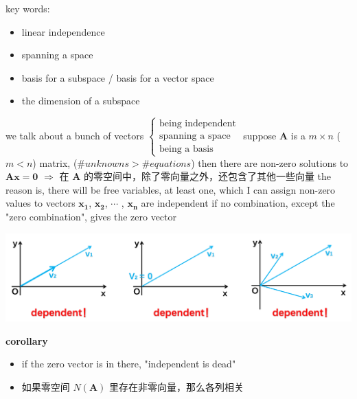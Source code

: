 \documentclass[12pt, a4paper]{article}
\begin{document}
{\noindent key words:
\begin{itemize}
	\item linear independence
	\item spanning a space
	\item basis for a subspace / basis for a vector space
	\item the dimension of a subspace
\end{itemize}
we talk about a bunch of vectors 
\begin{math}
	\left\{
		\begin{array}{l}
			{\text{being independent}} \\
			{\text{spanning a space}} \\
			{\text{being a basis}}
		\end{array}
	\right.
\end{math}
\vspace{14pt}
\newline
suppose ${\mathbf{A}}$ is a $m \times n$ ($m < n$) matrix, ($\#unknowns > \#equations$)
\newline
then there are non-zero solutions to ${\mathbf{A}}{\mathbf{x}} = {\mathbf{0}}$
\newline
$\Longrightarrow$ 在 ${\mathbf{A}}$ 的零空间中，除了零向量之外，还包含了其他一些向量
\vspace{14pt}
\newline
the reason is, there will be free variables, at least one, which I can assign non-zero values to
\vspace{14pt}
\newline
vectors ${\mathbf{x_1}}$, ${\mathbf{x_2}}$, $\cdots$ , ${\mathbf{x_n}}$ are independent if no combination, except the "zero combination", gives the zero vector
\begin{center}
	\includegraphics[scale=0.6]{figures/S9-1.png}
\end{center}
{\textcolor{anhao-purple}{\bf{corollary}}}
\begin{itemize}
	\item if the zero vector is in there, "independent is dead"
	\item 如果零空间 $N({\mathbf{A}})$ 里存在非零向量，那么各列相关

\end{itemize}}
\end{document}
